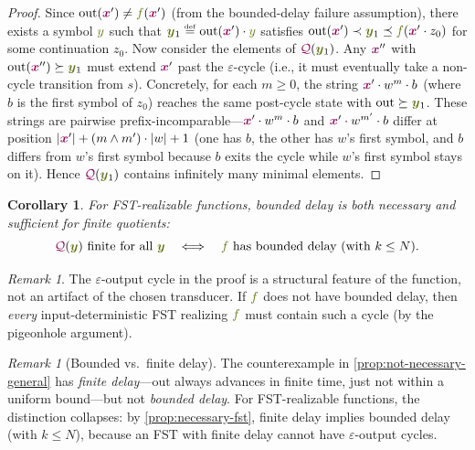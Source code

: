 \documentclass{article}
\newcommand{\mymacro}[1]{#1}
\newcommand{\defeq}{\mathrel{\overset{\raisebox{-0.25ex}{\textnormal{\tiny def}}}{=}}}
\newcommand{\Quotient}{{\color{TokenColor}\mathcal{Q}}}
\newcommand{\transFnSym}[0]{f}
\newcommand{\transFn}{\ensuremath{{\color{CharacterColor}\transFnSym}}\xspace}
\newcommand{\srcStr}{\ensuremath{{\color{TokenColor}\boldsymbol{x}}}\xspace}
\newcommand{\tgtSym}{{\color{CharacterColor}y}}
\newcommand{\tgtStr}{{\color{CharacterColor}\boldsymbol{y}}}
\newcommand{\state}{\mymacro{s}}
\newcommand{\committed}{\mathrm{out}}
\theoremstyle{plain}
\newtheorem{corollary}[theorem]{Corollary}
\theoremstyle{definition}
\theoremstyle{remark}
\newtheorem{remark}[theorem]{Remark}
\begin{document}
\begin{proof}
Since $\committed(\srcStr') \neq \transFn(\srcStr')$ (from the bounded-delay
failure assumption), there exists a symbol $\tgtSym$ such that
$\tgtStr_1 \defeq \committed(\srcStr') \cdot \tgtSym$ satisfies
$\committed(\srcStr') \prec \tgtStr_1 \preceq \transFn(\srcStr' \cdot z_0)$
for some continuation $z_0$.  Now consider the elements of $\Quotient(\tgtStr_1)$.
Any $\srcStr''$ with $\committed(\srcStr'') \succeq \tgtStr_1$ must extend
$\srcStr'$ past the $\varepsilon$-cycle (i.e., it must eventually take a
non-cycle transition from $\state$).  Concretely, for each $m \geq 0$, the
string $\srcStr' \cdot w^m \cdot b$ (where $b$ is the first symbol of $z_0$)
reaches the same post-cycle state with $\committed \succeq \tgtStr_1$.  These
strings are pairwise prefix-incomparable---$\srcStr' \cdot w^m \cdot b$ and
$\srcStr' \cdot w^{m'} \cdot b$ differ at position $|\srcStr'| + (m \wedge m')
\cdot |w| + 1$ (one has $b$, the other has $w$'s first symbol, and $b$ differs
from $w$'s first symbol because $b$ exits the cycle while $w$'s first symbol
stays on it).  Hence $\Quotient(\tgtStr_1)$ contains infinitely many minimal
elements.
\end{proof}

\begin{corollary}
\label{cor:fst-equivalence}
For FST-realizable functions, bounded delay is both necessary and sufficient
for finite quotients:
\[
  \text{$\Quotient(\tgtStr)$ finite for all $\tgtStr$}
  \quad\Longleftrightarrow\quad
  \text{$\transFn$ has bounded delay (with $k \leq N$)}.
\]
\end{corollary}

\begin{remark}
The $\varepsilon$-output cycle in the proof is a structural feature of the
function, not an artifact of the chosen transducer.  If $\transFn$ does not
have bounded delay, then \emph{every} input-deterministic FST realizing
$\transFn$ must contain such a cycle (by the pigeonhole argument).
\end{remark}

\begin{remark}[Bounded vs.\ finite delay]
The counterexample in \cref{prop:not-necessary-general} has \emph{finite
delay}---$\committed$ always advances in finite time, just not within a uniform
bound---but not \emph{bounded delay}.  For FST-realizable functions, the
distinction collapses: by \cref{prop:necessary-fst}, finite delay implies
bounded delay (with $k \leq N$), because an FST with finite delay cannot have
$\varepsilon$-output cycles.
\end{remark}
\end{document}
